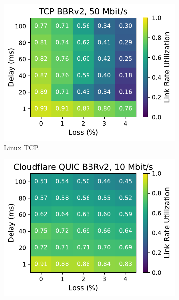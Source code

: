 \begin{figure}[ht]
\begin{subfigure}[b]{0.22\linewidth}
        \includegraphics[width=\linewidth,trim={0 0 2cm 0},clip]{splitting-paper/figures/heatmaps/heatmap_tcp_bbr2_50mbps.pdf}
        \caption{Linux TCP.}
    \end{subfigure}
    \begin{subfigure}[b]{0.22\linewidth}
        \includegraphics[width=\linewidth,trim={0 0 2cm 0},clip]{splitting-paper/figures/heatmaps/heatmap_quiche_bbr2_10mbps.pdf}

\end{subfigure}
\end{figure}
